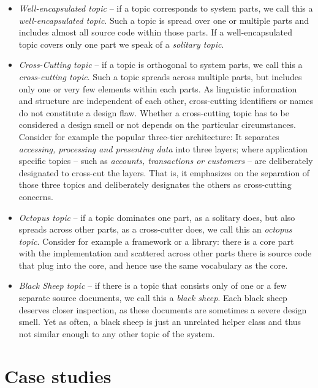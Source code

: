 \begin{itemize}
  \item \emph{Well-encapsulated topic} -- if a topic corresponds to system parts, we call this a \emph{well-encapsulated topic}. Such a topic is spread over one or multiple parts and includes almost all source code within those parts. If a well-encapsulated topic covers only one part we speak of a \emph{solitary topic}.

  \item \emph{Cross-Cutting topic} -- if a topic is orthogonal to system parts, we call this a \emph{cross-cutting topic}. Such a topic spreads across multiple parts, but includes only one or very few elements within each parts. As linguistic information and structure are independent of each other, cross-cutting identifiers or names do not constitute a design flaw. Whether a cross-cutting topic has to be considered a design smell or not depends on the particular circumstances. Consider for example the popular three-tier architecture: It separates \emph{accessing, processing \emph{and} presenting data} into three layers; where application specific topics -- such as \eg \emph{accounts, transactions \emph{or} customers} -- are deliberately designated to cross-cut the layers. That is, it emphasizes on the separation of those three topics and deliberately designates the others as cross-cutting concerns.

 \item \emph{Octopus topic} -- if a topic dominates one part, as a solitary does, but also spreads across other parts, as a cross-cutter does, we call this an \emph{octopus topic}. Consider for example a framework or a library: there is a core part with the implementation and scattered across other parts there is source code that plug into the core, and hence use the same vocabulary as the core.

  \item \emph{Black Sheep topic} -- if there is a topic that consists only of one or a few separate source documents, we call this a \emph{black sheep}. Each black sheep deserves closer inspection, as these documents are sometimes a severe design smell. Yet as often, a black sheep is just an unrelated helper class and thus not similar enough to any other topic of the system.
\end{itemize}

\section{Case studies}\label{sec:validation}

